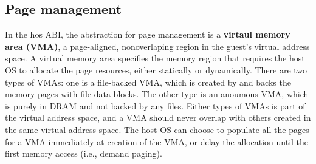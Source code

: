 \subsection{Page management}
\label{sec:abi:memory}




In the hos ABI, the abstraction for page management
is a {\bf virtaul memory area (VMA)}, a page-aligned, nonoverlaping region
in the guest's virtual address space.
A virtual memory area
specifies the memory region that requires the host OS to allocate the page resources,
either statically or dynamically.
There are two types of VMAs: one is a file-backed VMA, which is created by  and backs the memory pages with file data blocks.
The other type is an anoumous VMA, which is purely in DRAM and not backed by any files.
Either types of VMAs is part of the virtual address space,
and a VMA should never overlap with others created in the same virtual address space.
The host OS can choose to populate all the pages for a VMA immediately at creation of the VMA,
or delay the allocation until the first memory access (i.e., demand paging).











